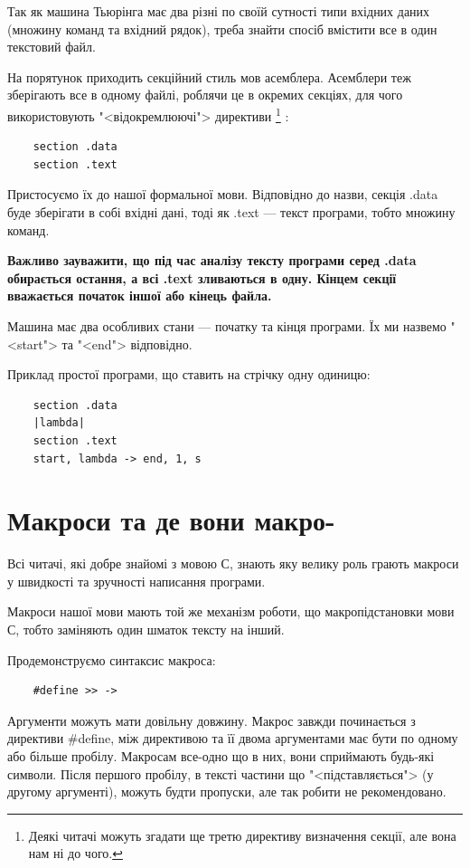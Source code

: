 \documentclass[oneside,final,14pt]{extreport}
\begin{document}
Так як машина Тьюрінга має два різні по своїй сутності типи вхідних даних (множину команд та вхідний рядок), треба знайти спосіб вмістити все в один текстовий файл.

На порятунок приходить секційний стиль мов асемблера.
Асемблери теж зберігають все в одному файлі, роблячи це в окремих секціях, для чого використовують "<відокремлюючі"> директиви
\footnote{Деякі читачі можуть згадати ще третю директиву визначення секції, але вона нам ні до чого.}
:
\begin{verbatim}
	section .data
	section .text
\end{verbatim}
Пристосуємо їх до нашої формальної мови. Відповідно до назви, секція .data буде зберігати в собі вхідні дані, тоді як .text --- текст програми, тобто множину команд.

{\bfseries Важливо зауважити, що під час аналізу тексту програми серед .data обирається остання, а всі .text зливаються в одну. Кінцем секції вважається початок іншої або кінець файла.}

Машина має два особливих стани --- початку та кінця програми. Їх ми назвемо "<start"> та "<end"> відповідно.

Приклад простої програми, що ставить на стрічку одну одиницю:
\begin{verbatim}
	section .data
	|lambda|
	section .text
	start, lambda -> end, 1, s
\end{verbatim}

\section{Макроси та де вони макро-}
Всі читачі, які добре знайомі з мовою С, знають яку велику роль грають макроси у швидкості та зручності написання програми.

Макроси нашої мови мають той же механізм роботи, що макропідстановки мови С, тобто заміняють один шматок тексту на інший.
		
Продемонструємо синтаксис макроса:
		
\begin{verbatim}
	#define >> ->
\end{verbatim}
		
Аргументи можуть мати довільну довжину. Макрос завжди починається з директиви {\ttfamily \#define}, між директивою та її двома аргументами має бути по одному або більше пробілу. Макросам все-одно що в них, вони сприймають будь-які символи. Після першого пробілу, в тексті частини що "<підставляється"> (у другому аргументі), можуть будти пропуски, але так робити не рекомендовано.
\end{document}
